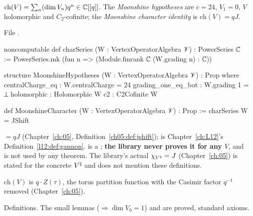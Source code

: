 \begin{definition}\label{l14:def:moonchar}
$\mathrm{ch}(V) = \sum_n(\dim V_n)q^n\in{\mathbb{C}}[[q]]$. The \emph{Moonshine hypotheses} are $c=24$, $V_1 = 0$, $V$ holomorphic and
$C_2$-cofinite; the \emph{Moonshine character identity} is $\mathrm{ch}(V) = qJ$.
\end{definition}
\noindent File .
\begin{leancode}
noncomputable def charSeries (W : VertexOperatorAlgebra 𝒱) : PowerSeries ℂ :=
  PowerSeries.mk (fun n => (Module.finrank ℂ (W.grading n) : ℂ))

structure MoonshineHypotheses (W : VertexOperatorAlgebra 𝒱) : Prop where
  centralCharge_eq : W.centralCharge = 24
  grading_one_eq_bot : W.grading 1 = ⊥
  holomorphic : Holomorphic W
  c2 : C2Cofinite W

def MoonshineCharacter (W : VertexOperatorAlgebra 𝒱) : Prop := charSeries W = JShift
\end{leancode}
\begin{dictionary}
 $=qJ$ (Chapter~\ref{ch:05}, Definition~\ref{ch05:def:jshift});  is Chapter~\ref{ch:L12}'s
Definition~\ref{l12:def:gannon}.  is a ; \textbf{the library never proves it for any $V$},
and  is not used by any theorem. The library's actual $\chi_{{V^{\natural}}} = J$ (Chapter~\ref{ch:05}) is stated
for the concrete ${V^{\natural}}$ and does not mention these definitions.
\end{dictionary}
\begin{physics}
$\mathrm{ch}(V)$ is $q\cdot Z(\tau)$, the torus partition function with the Casimir factor $q^{-1}$ removed (Chapter~\ref{ch:05}).
\end{physics}
\begin{status}
Definitions. The small lemmas  ($\Rightarrow\dim V_0 = 1$) and
 are proved, standard axioms.
\end{status}

